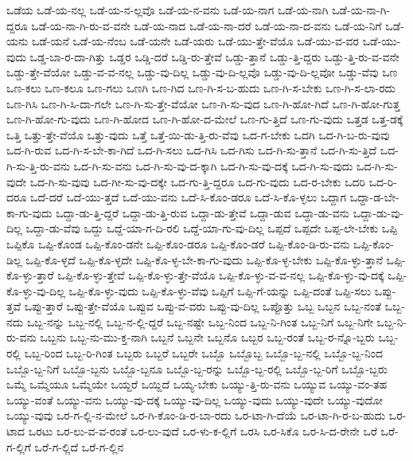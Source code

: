 {ಒಡೆಯ
ಒಡೆ-ಯ-ನಲ್ಲ
ಒಡೆ-ಯ-ನ-ಲ್ಲವೊ
ಒಡೆ-ಯ-ನ-ವನು
ಒಡೆ-ಯ-ನಾಗ
ಒಡೆ-ಯ-ನಾಗಿ
ಒಡೆ-ಯ-ನಾ-ಗಿ-ದ್ದರೂ
ಒಡೆ-ಯ-ನಾ-ಗಿ-ರು-ವ-ವನೇ
ಒಡೆ-ಯ-ನಾದ
ಒಡೆ-ಯ-ನಾ-ದರೆ
ಒಡೆ-ಯ-ನಾ-ದ-ವನು
ಒಡೆ-ಯ-ನಿಗೆ
ಒಡೆ-ಯನು
ಒಡೆ-ಯನೆ
ಒಡೆ-ಯ-ನೆಂಬ
ಒಡೆ-ಯನೇ
ಒಡೆ-ಯರು
ಒಡೆ-ಯು-ತ್ತೇ-ವೆಯೊ
ಒಡೆ-ಯು-ವ-ವರ
ಒಡೆ-ಯು-ವುದು
ಒಡ್ಡ-ಬಾ-ರ-ದಾ-ಗಿತ್ತು
ಒಡ್ಡರ
ಒಡ್ಡಿ-ದರೆ
ಒಡ್ಡಿ-ರು-ತ್ತೇವೆ
ಒಡ್ಡು-ತ್ತಾನೆ
ಒಡ್ಡು-ತ್ತಿ-ದ್ದರು
ಒಡ್ಡು-ತ್ತಿ-ರು-ವ-ವನೇ
ಒಡ್ಡು-ತ್ತೇ-ವೆಯೋ
ಒಡ್ಡು-ವ-ವ-ನಲ್ಲ
ಒಡ್ಡು-ವು-ದಿಲ್ಲ
ಒಡ್ಡು-ವು-ದಿ-ಲ್ಲವೊ
ಒಡ್ಡು-ವು-ದಿ-ಲ್ಲವೋ
ಒಡ್ಡು-ವೆವು
ಒಣ
ಒಣ-ಕಲು
ಒಣ-ಕಲೂ
ಒಣ-ಗಲು
ಒಣಗಿ
ಒಣ-ಗಿದ
ಒಣ-ಗಿ-ಸ-ಬ-ಹುದು
ಒಣ-ಗಿ-ಸ-ಬೇಕು
ಒಣ-ಗಿ-ಸ-ಲಾ-ರದು
ಒಣ-ಗಿಸಿ
ಒಣ-ಗಿ-ಸಿ-ದಾ-ಗಲೇ
ಒಣ-ಗಿ-ಸು-ತ್ತೇ-ವೆಯೋ
ಒಣ-ಗಿ-ಸು-ವುದ
ಒಣ-ಗಿ-ಹೋ-ಗಿದೆ
ಒಣ-ಗಿ-ಹೋ-ಗುತ್ತ
ಒಣ-ಗಿ-ಹೋ-ಗು-ವುದು
ಒಣ-ಗಿ-ಹೋದ
ಒಣ-ಗಿ-ಹೋ-ದ-ಮೇಲೆ
ಒಣ-ಗು-ತ್ತಿದೆ
ಒಣ-ಗು-ವುದು
ಒತ್ತಡ
ಒತ್ತ-ಡಕ್ಕೆ
ಒತ್ತಿ
ಒತ್ತು-ತ್ತೇ-ವೆಯೊ
ಒತ್ತು-ವುದು
ಒತ್ತೆ
ಒತ್ತೆ-ಯಿ-ಡು-ತ್ತಿ-ರು-ವೆವು
ಒದ-ಗ-ಬೇಕು
ಒದಗಿ
ಒದ-ಗಿ-ಬ-ರು-ವುವು
ಒದ-ಗಿ-ರುವ
ಒದ-ಗಿ-ಸ-ಬೇ-ಕಾ-ಗಿದೆ
ಒದ-ಗಿ-ಸಲು
ಒದ-ಗಿಸಿ
ಒದ-ಗಿಸು
ಒದ-ಗಿ-ಸು-ತ್ತಾನೆ
ಒದ-ಗಿ-ಸು-ತ್ತಿದೆ
ಒದ-ಗಿ-ಸು-ತ್ತಿ-ರು-ವನು
ಒದ-ಗಿ-ಸು-ವನು
ಒದ-ಗಿ-ಸು-ವು-ದ-ಕ್ಕಾಗಿ
ಒದ-ಗಿ-ಸು-ವು-ದಕ್ಕೆ
ಒದ-ಗಿ-ಸು-ವುದು
ಒದ-ಗಿ-ಸು-ವುದೇ
ಒದ-ಗಿ-ಸು-ವುವು
ಒದ-ಗೀ-ಸು-ವು-ದಕ್ಕೇ
ಒದ-ಗು-ತ್ತಿ-ದ್ದರೂ
ಒದ-ಗು-ವುದು
ಒದ-ರ-ಬೇಕು
ಒದರಿ
ಒದ-ರಿ-ದರೂ
ಒದೆ-ದರೆ
ಒದೆ-ಯು-ತ್ತದೆ
ಒದೆ-ಯು-ವನು
ಒದೆ-ಸಿ-ಕೊಂ-ಡರೂ
ಒದೆ-ಸಿ-ಕೊ-ಳ್ಳಲು
ಒದ್ದಾಗ
ಒದ್ದಾ-ಡ-ಬೇ-ಕಾ-ಗು-ವುದು
ಒದ್ದಾ-ಡು-ತ್ತಿ-ದ್ದರೆ
ಒದ್ದಾ-ಡು-ತ್ತಿ-ರುವ
ಒದ್ದಾ-ಡು-ತ್ತೇವೆ
ಒದ್ದಾ-ಡುವ
ಒದ್ದಾ-ಡು-ವನು
ಒದ್ದಾ-ಡು-ವು-ದಿಲ್ಲ
ಒದ್ದಾ-ಡು-ವೆವು
ಒದ್ದು
ಒದ್ದೆ-ಯಾ-ಗ-ದಿ-ರಲಿ
ಒದ್ದೆ-ಯಾ-ಗು-ವು-ದಿಲ್ಲ
ಒಪ್ಪದೆ
ಒಪ್ಪದೇ
ಒಪ್ಪ-ಲೇ-ಬೇಕು
ಒಪ್ಪಿ
ಒಪ್ಪಿಕೊ
ಒಪ್ಪಿ-ಕೊಂಡ
ಒಪ್ಪಿ-ಕೊಂ-ಡನೇ
ಒಪ್ಪಿ-ಕೊಂ-ಡರೂ
ಒಪ್ಪಿ-ಕೊಂ-ಡರೆ
ಒಪ್ಪಿ-ಕೊಂ-ಡಿ-ರು-ವನು
ಒಪ್ಪಿ-ಕೊಂ-ಡಿಲ್ಲ
ಒಪ್ಪಿ-ಕೊ-ಳ್ಳದೆ
ಒಪ್ಪಿ-ಕೊ-ಳ್ಳದೇ
ಒಪ್ಪಿ-ಕೊ-ಳ್ಳ-ಬೇ-ಕಾ-ಗು-ವುದು
ಒಪ್ಪಿ-ಕೊ-ಳ್ಳ-ಬೇಕು
ಒಪ್ಪಿ-ಕೊ-ಳ್ಳು-ತ್ತಾನೆ
ಒಪ್ಪಿ-ಕೊ-ಳ್ಳು-ತ್ತಾರೆ
ಒಪ್ಪಿ-ಕೊ-ಳ್ಳು-ತ್ತೇವೆ
ಒಪ್ಪಿ-ಕೊ-ಳ್ಳು-ತ್ತೇ-ವೆಯೊ
ಒಪ್ಪಿ-ಕೊ-ಳ್ಳು-ವ-ವ-ನಲ್ಲ
ಒಪ್ಪಿ-ಕೊ-ಳ್ಳು-ವು-ದಕ್ಕೆ
ಒಪ್ಪಿ-ಕೊ-ಳ್ಳು-ವು-ದಿಲ್ಲ
ಒಪ್ಪಿ-ಕೊ-ಳ್ಳು-ವುದು
ಒಪ್ಪಿ-ಕೊ-ಳ್ಳು-ವೆವು
ಒಪ್ಪಿಗೆ
ಒಪ್ಪಿ-ಗೆ-ಯನ್ನು
ಒಪ್ಪಿ-ದಂತೆ
ಒಪ್ಪಿ-ಸಲು
ಒಪ್ಪು-ತ್ತವೆ
ಒಪ್ಪು-ತ್ತಾರೆ
ಒಪ್ಪು-ತ್ತೇ-ವೆಯೊ
ಒಪ್ಪುವ
ಒಪ್ಪು-ವ-ವರು
ಒಪ್ಪು-ವು-ದಿಲ್ಲ
ಒಪ್ಪೊತ್ತು
ಒಬ್ಬ
ಒಬ್ಬನ
ಒಬ್ಬ-ನಂತೆ
ಒಬ್ಬ-ನದು
ಒಬ್ಬ-ನನ್ನು
ಒಬ್ಬ-ನಲ್ಲಿ
ಒಬ್ಬ-ನ-ಲ್ಲಿ-ದ್ದರೆ
ಒಬ್ಬ-ನಷ್ಟೇ
ಒಬ್ಬ-ನಿಂದ
ಒಬ್ಬ-ನಿ-ಗಿಂತ
ಒಬ್ಬ-ನಿಗೆ
ಒಬ್ಬ-ನಿಗೇ
ಒಬ್ಬ-ನಿ-ರು-ವನು
ಒಬ್ಬನು
ಒಬ್ಬ-ನು-ಮು-ಕ್ತ-ನಾಗಿ
ಒಬ್ಬನೆ
ಒಬ್ಬನೇ
ಒಬ್ಬನೊ
ಒಬ್ಬರ
ಒಬ್ಬ-ರಂತೆ
ಒಬ್ಬ-ರ-ನ್ನೊ-ಬ್ಬರು
ಒಬ್ಬ-ರಲ್ಲಿ
ಒಬ್ಬ-ರಿಂದ
ಒಬ್ಬ-ರಿ-ಗಿಂತ
ಒಬ್ಬರು
ಒಬ್ಬರೆ
ಒಬ್ಬರೇ
ಒಬ್ಬೊ
ಒಬ್ಬೊಬ್ಬ
ಒಬ್ಬೊ-ಬ್ಬ-ನಲ್ಲಿ
ಒಬ್ಬೊ-ಬ್ಬ-ನಿಂದ
ಒಬ್ಬೊ-ಬ್ಬ-ನಿಗೆ
ಒಬ್ಬೊ-ಬ್ಬನು
ಒಬ್ಬೊ-ಬ್ಬನೂ
ಒಬ್ಬೊ-ಬ್ಬ-ರನ್ನು
ಒಬ್ಬೊ-ಬ್ಬ-ರಲ್ಲಿ
ಒಬ್ಬೊ-ಬ್ಬ-ರಿಗೆ
ಒಬ್ಬೊ-ಬ್ಬರು
ಒಮ್ಮೆ
ಒಮ್ಮೆಯೂ
ಒಮ್ಮೆಯೇ
ಒಯ್ದರೆ
ಒಯ್ದಿದೆ
ಒಯ್ಯ-ಬೇಕು
ಒಯ್ಯು-ತ್ತಿ-ರು-ವನು
ಒಯ್ಯುವ
ಒಯ್ಯು-ವಂ-ತಹ
ಒಯ್ಯು-ವಂತೆ
ಒಯ್ಯು-ವನು
ಒಯ್ಯು-ವು-ದಕ್ಕೆ
ಒಯ್ಯು-ವು-ದಿಲ್ಲ
ಒಯ್ಯು-ವುದು
ಒಯ್ಯು-ವುದೇ
ಒಯ್ಯು-ವುದೋ
ಒಯ್ಯು-ವುವು
ಒರ-ಗ-ಲ್ಲಿ-ನ-ಮೇಲೆ
ಒರ-ಗಿ-ಕೊಂ-ಡಿ-ರ-ಬಾ-ರದು
ಒರ-ಟಾ-ಗಿ-ದೆಯೆ
ಒರ-ಟಾ-ಗಿ-ರ-ಬ-ಹುದು
ಒರ-ಟಾದ
ಒರಟು
ಒರ-ಲು-ವ-ವ-ರಂತೆ
ಒರ-ಲು-ವುದೆ
ಒರ-ಳು-ಕ-ಲ್ಲಿಗೆ
ಒರಸಿ
ಒರ-ಸಿಕೊ
ಒರ-ಸಿ-ದ-ರೇನೇ
ಒರೆ
ಒರೆ-ಗ-ಲ್ಲಿಗೆ
ಒರೆ-ಗ-ಲ್ಲಿದೆ
ಒರೆ-ಗ-ಲ್ಲಿನ
}
